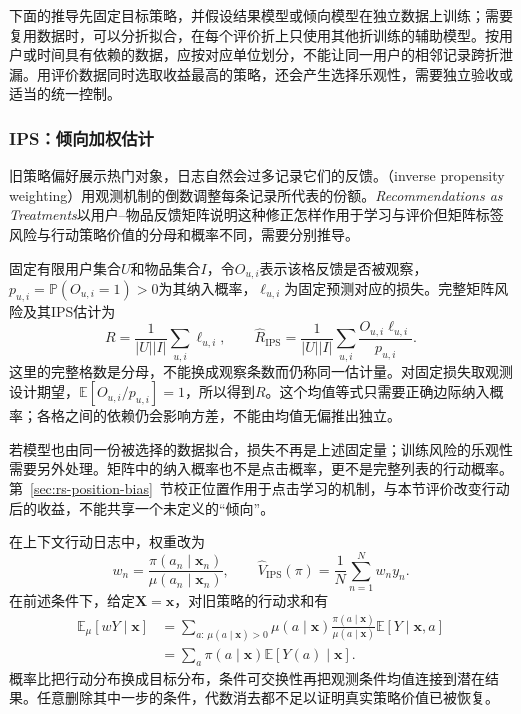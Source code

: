 下面的推导先固定目标策略，并假设结果模型或倾向模型在独立数据上训练；需要复用数据时，可以分折拟合，在每个评价折上只使用其他折训练的辅助模型。按用户或时间具有依赖的数据，应按对应单位划分，不能让同一用户的相邻记录跨折泄漏。用评价数据同时选取收益最高的策略，还会产生选择乐观性，需要独立验收或适当的统一控制。

\Needspace{90mm}
\subsubsection{IPS：倾向加权估计}
\label{sec:rs-evaluation-ips}

旧策略偏好展示热门对象，日志自然会过多记录它们的反馈。（inverse propensity weighting）用观测机制的倒数调整每条记录所代表的份额。\emph{Recommendations as Treatments}以用户--物品反馈矩阵说明这种修正怎样作用于学习与评价但矩阵标签风险与行动策略价值的分母和概率不同，需要分别推导。

固定有限用户集合$U$和物品集合$I$，令$O_{u,i}$表示该格反馈是否被观察，$p_{u,i}=\mathbb P(O_{u,i}=1)>0$为其纳入概率，$\ell_{u,i}$为固定预测对应的损失。完整矩阵风险及其IPS估计为
\begin{equation}
  R=\frac{1}{|U||I|}\sum_{u,i}\ell_{u,i},
  \qquad
  \widehat R_{\mathrm{IPS}}
   =\frac{1}{|U||I|}
      \sum_{u,i}\frac{O_{u,i}\ell_{u,i}}{p_{u,i}}.
  \label{eq:rs-evaluation-matrix-ips}
\end{equation}
这里的完整格数是分母，不能换成观察条数而仍称同一估计量。对固定损失取观测设计期望，$\mathbb E[O_{u,i}/p_{u,i}]=1$，所以得到$R$。这个均值等式只需要正确边际纳入概率；各格之间的依赖仍会影响方差，不能由均值无偏推出独立。

若模型也由同一份被选择的数据拟合，损失不再是上述固定量；训练风险的乐观性需要另外处理。矩阵中的纳入概率也不是点击概率，更不是完整列表的行动概率。第~\ref{sec:rs-position-bias}~节校正位置作用于点击学习的机制，与本节评价改变行动后的收益，不能共享一个未定义的“倾向”。

在上下文行动日志中，权重改为
\begin{equation}
  w_n=\frac{\pi(a_n\mid\bm x_n)}
             {\mu(a_n\mid\bm x_n)},\qquad
  \widehat V_{\mathrm{IPS}}(\pi)
       =\frac{1}{N}\sum_{n=1}^{N}w_ny_n.
  \label{eq:rs-evaluation-policy-ips}
\end{equation}
在前述条件下，给定$\bm X=\bm x$，对旧策略的行动求和有
\[
  \begin{aligned}
    \mathbb E_\mu[wY\mid\bm x]
      &=\sum_{a:\,\mu(a\mid\bm x)>0}\mu(a\mid\bm x)
         \frac{\pi(a\mid\bm x)}{\mu(a\mid\bm x)}
         \mathbb E[Y\mid\bm x,a]\\
      &=\sum_a\pi(a\mid\bm x)\mathbb E[Y(a)\mid\bm x].
  \end{aligned}
\]
概率比把行动分布换成目标分布，条件可交换性再把观测条件均值连接到潜在结果。任意删除其中一步的条件，代数消去都不足以证明真实策略价值已被恢复。

